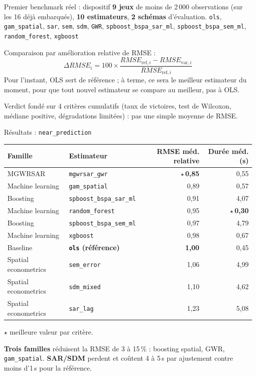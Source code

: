 \documentclass[aspectratio=169,11pt]{beamer}
\begin{document}
\begin{frame}{Premier benchmark réel : dispositif}
\small
\textbf{9 jeux} de moins de 2\,000 observations (sur les 16 déjà embarqués),
\textbf{10 estimateurs}, \textbf{2 schémas} d'évaluation.
\vspace{0.2cm}
\texttt{ols}, \texttt{gam\_spatial}, \texttt{sar}, \texttt{sem}, \texttt{sdm},
\texttt{GWR}, \texttt{spboost\_bspa\_sar\_ml}, \texttt{spboost\_bspa\_sem\_ml},
\texttt{random\_forest}, \texttt{xgboost}
\vspace{0.2cm}

Comparaison par amélioration relative de RMSE :
\[
\Delta RMSE_i = 100\times\frac{RMSE_{\mathrm{ref},i}-RMSE_{\mathrm{var},i}}{RMSE_{\mathrm{ref},i}}
\]
\vspace{0.1cm}
{\scriptsize\textcolor{mygray}{Pour l'instant, OLS sert de référence ; à terme, ce sera le meilleur estimateur du moment, pour que tout nouvel estimateur se compare au meilleur, pas à OLS.}}
\vspace{0.15cm}

Verdict fondé sur 4 critères cumulatifs (taux de victoires, test de Wilcoxon,
médiane positive, dégradations limitées) : pas une simple moyenne de RMSE.
\end{frame}

\begin{frame}{Résultats : \texttt{near\_prediction}}
\scriptsize
\begin{tabularx}{\textwidth}{>{\RaggedRight\arraybackslash}p{} X r r}
\toprule
Famille & Estimateur & RMSE méd. relative & Durée méd. (s) \\
\midrule
MGWRSAR & \texttt{mgwrsar\_gwr} & $\star$\,\textbf{0,85} & 0,55 \\
Machine learning & \texttt{gam\_spatial} & 0,89 & 0,57 \\
Boosting & \texttt{spboost\_bspa\_sar\_ml} & 0,91 & 4,07 \\
Machine learning & \texttt{random\_forest} & 0,95 & $\star$\,\textbf{0,30} \\
Boosting & \texttt{spboost\_bspa\_sem\_ml} & 0,97 & 4,79 \\
Machine learning & \texttt{xgboost} & 0,98 & 0,67 \\
Baseline & \textbf{\texttt{ols} (référence)} & \textbf{1,00} & 0,45 \\
Spatial econometrics & \texttt{sem\_error} & 1,06 & 4,99 \\
Spatial econometrics & \texttt{sdm\_mixed} & 1,10 & 4,62 \\
Spatial econometrics & \texttt{sar\_lag} & 1,23 & 5,08 \\
\bottomrule
\end{tabularx}
\vspace{0.2cm}
{\scriptsize $\star$ meilleure valeur par critère.}
\vspace{0.1cm}

\textbf{Trois familles} réduisent la RMSE de 3 à 15\,\% : boosting spatial, GWR,
\texttt{gam\_spatial}. \textbf{SAR/SDM} perdent et coûtent
4 à 5\,s par ajustement contre moins d'1\,s pour la référence.
\end{frame}
\end{document}

